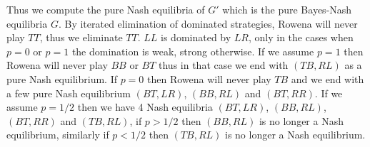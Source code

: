 \documentclass[12pt]{article}
\newenvironment{answer}[2][Answer]{\begin{trivlist}
\item[\hskip \labelsep {\bfseries #1}\hskip \labelsep {\bfseries #2:}]}{\end{trivlist}}
\begin{document}
\begin{answer}{a)}
Thus we compute the pure Nash equilibria of $G'$ which is the pure Bayes-Nash equilibria $G$. By iterated elimination of dominated strategies, Rowena will never play $TT$, thus we eliminate $TT$. $LL$ is dominated by $LR$, only in the cases when $p=0$ or $p=1$ the domination is weak, strong otherwise. If we assume $p=1$ then Rowena will never play $BB$ or $BT$ thus in that case we end with $(TB,RL)$ as a pure Nash equilibrium. If $p=0$ then Rowena will never play $TB$ and we end with a few pure Nash equilibrium $(BT,LR)$, $(BB,RL)$ and $(BT,RR)$. If we assume $p=1/2$ then we have 4 Nash equilibria $(BT,LR)$, $(BB,RL)$, $(BT,RR)$ and $(TB,RL)$, if $p>1/2$ then $(BB,RL)$ is no longer a Nash equilibrium, similarly if $p<1/2$ then $(TB,RL)$ is no longer a Nash equilibrium.
\end{answer}
\end{document}
